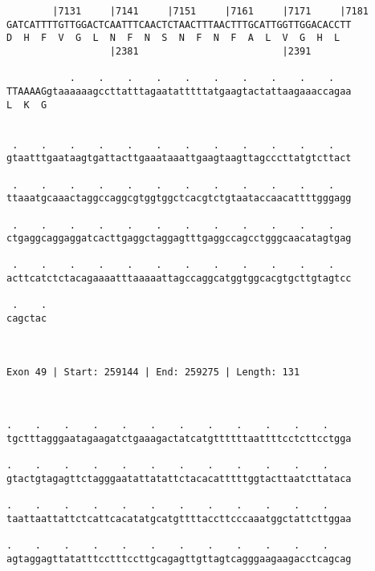 \documentclass{article}
\begin{document}
\begin{Verbatim}
        |7131     |7141     |7151     |7161     |7171     |7181
GATCATTTTGTTGGACTCAATTTCAACTCTAACTTTAACTTTGCATTGGTTGGACACCTT
D  H  F  V  G  L  N  F  N  S  N  F  N  F  A  L  V  G  H  L  
                  |2381                         |2391       
  
           .    .    .    .    .    .    .    .    .    .   
TTAAAAGgtaaaaaagccttatttagaatatttttatgaagtactattaagaaaccagaa
L  K  G                                                     
                                                            
  
 .    .    .    .    .    .    .    .    .    .    .    .   
gtaatttgaataagtgattacttgaaataaattgaagtaagttagcccttatgtcttact
                                                            
 .    .    .    .    .    .    .    .    .    .    .    .   
ttaaatgcaaactaggccaggcgtggtggctcacgtctgtaataccaacattttgggagg
                                                            
 .    .    .    .    .    .    .    .    .    .    .    .   
ctgaggcaggaggatcacttgaggctaggagtttgaggccagcctgggcaacatagtgag
                                                            
 .    .    .    .    .    .    .    .    .    .    .    .   
acttcatctctacagaaaatttaaaaattagccaggcatggtggcacgtgcttgtagtcc
                                                            
 .    .
cagctac
       
       
 
Exon 49 | Start: 259144 | End: 259275 | Length: 131



.    .    .    .    .    .    .    .    .    .    .    .    
tgctttagggaatagaagatctgaaagactatcatgttttttaattttcctcttcctgga
                                                            
.    .    .    .    .    .    .    .    .    .    .    .    
gtactgtagagttctagggaatattatattctacacatttttggtacttaatcttataca
                                                            
.    .    .    .    .    .    .    .    .    .    .    .    
taattaattattctcattcacatatgcatgttttaccttcccaaatggctattcttggaa
                                                            
.    .    .    .    .    .    .    .    .    .    .    .    
agtaggagttatatttcctttccttgcagagttgttagtcagggaagaagacctcagcag
                                                            

\end{Verbatim}
\end{document}
